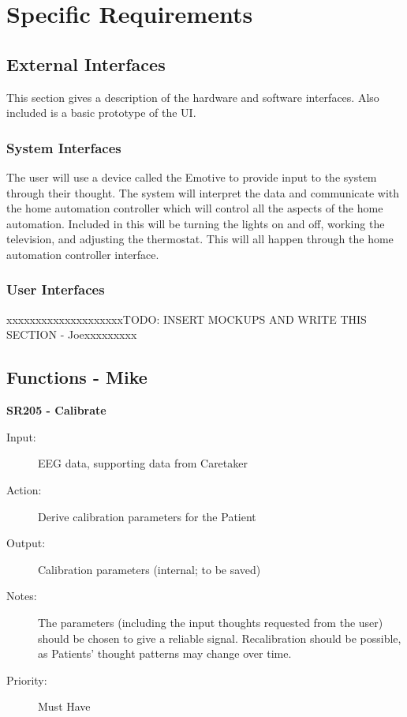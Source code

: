 \documentclass{article}
\begin{document}
\section{Specific Requirements}
\subsection{External Interfaces}
This section gives a description of the hardware and software interfaces. Also included is a basic prototype of the UI.

\subsubsection{System Interfaces}

The user will use a device called the Emotive to provide input to the system through their thought. The system will interpret the data and communicate with the home automation controller which will control all the aspects of the home automation. Included in this will be turning the lights on and off, working the television, and adjusting the thermostat. This will all happen through the home automation controller interface.

\subsubsection{User Interfaces}
{\color{red}xxxxxxxxxxxxxxxxxxxxTODO: INSERT MOCKUPS AND WRITE THIS SECTION - Joexxxxxxxxx}

\subsection{Functions - Mike}


\textbf{SR205 - Calibrate}
\begin{description}
    \item[Input:] EEG data, supporting data from Caretaker
    \item[Action:] Derive calibration parameters for the Patient
    \item[Output:] Calibration parameters (internal; to be saved)
    \item[Notes:] The parameters (including the input thoughts requested from
        the user) should be chosen to give a reliable signal. Recalibration
        should be possible, as Patients' thought patterns may change over
        time.
    \item[Priority:] Must Have
\end{description}
\end{document}
